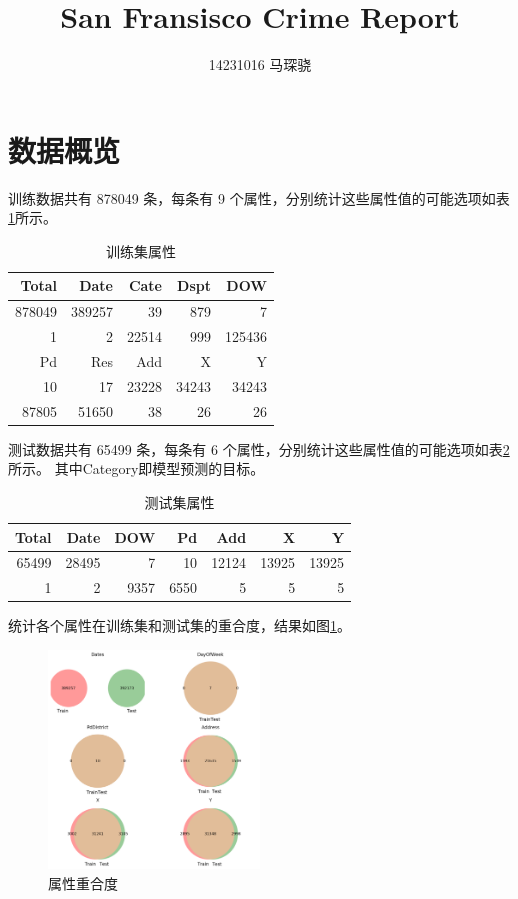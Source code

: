 \documentclass[a4paper, twocolumn]{article}
\author{14231016 马琛骁}
\title{San Fransisco Crime Report}
\begin{document}
\maketitle

\section{数据概览}

训练数据共有 878049 条，每条有 9 个属性，分别统计这些属性值的可能选项如表\ref{tab:train}所示。

\begin{table}[h]
    \centering
    \begin{tabular}{*{5}{r}}
        \hline
        Total& Date& Cate& Dspt& DOW \\
        \hline
        878049& 389257& 39& 879& 7 \\
        1& 2& 22514& 999& 125436 \\
        \hline
        \hline
        Pd& Res& Add& X& Y \\
        \hline
        10& 17& 23228& 34243& 34243 \\
        87805& 51650& 38& 26& 26 \\
        \hline
    \end{tabular}
    \caption{训练集属性}
    \label{tab:train}
\end{table}

测试数据共有 65499 条，每条有 6 个属性，分别统计这些属性值的可能选项如表\ref{tab:test}所示。
其中Category即模型预测的目标。

\begin{table}[h]
    \centering
    \begin{tabular}{*{7}{r}}
        \hline
        Total& Date& DOW& Pd& Add& X& Y \\
        \hline
        65499& 28495& 7& 10& 12124& 13925& 13925 \\
        1& 2& 9357& 6550& 5& 5& 5 \\
        \hline
    \end{tabular}
    \caption{测试集属性}
    \label{tab:test}
\end{table}

统计各个属性在训练集和测试集的重合度，结果如图\ref{fig:overlap}。

\begin{figure}[!h]
    \centering
    \includegraphics[width=0.5\textwidth]{overlap.png}
    \caption{属性重合度}
    \label{fig:overlap}
\end{figure}
\end{document}
